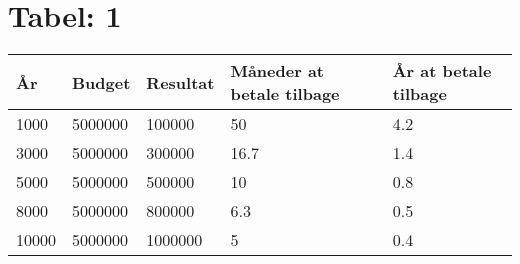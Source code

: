 \appendix
\thispagestyle{empty}
\clearpage
\chapter{Tabel: 1}

\begin{tabularx}{0.75\textwidth}{|X|X|X|X|X|}
\hline
År & Budget & Resultat & Måneder at betale tilbage & År at betale tilbage \\ \hline \hline
1000 & 5000000 & 100000 & 50 & 4.2 \\ \hline
3000 & 5000000 & 300000 & 16.7 & 1.4 \\ \hline
5000 & 5000000 & 500000 & 10 & 0.8 \\ \hline
8000 & 5000000 & 800000 & 6.3 & 0.5 \\ \hline
10000 & 5000000 & 1000000 & 5 & 0.4 \\ \hline
\end{tabularx}

